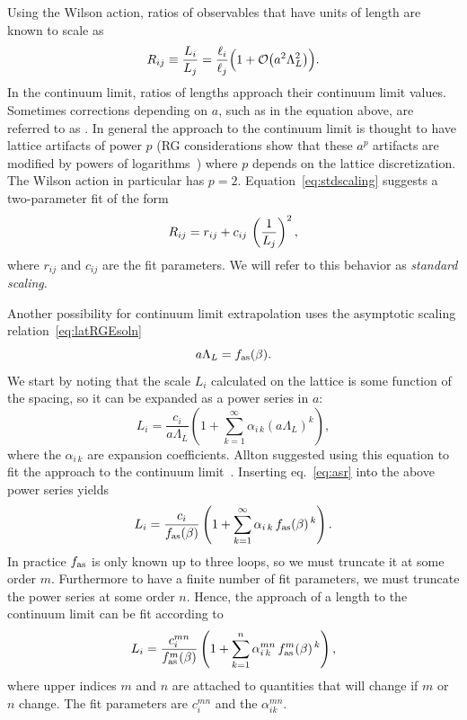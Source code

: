 Using the Wilson action, ratios of observables that have
units of length are known to scale as 
\begin{equation}\label{eq:stdscaling}
  R_{ij}\equiv\frac{L_i}{L_j}=\frac{\ell_i}{\ell_j}\Big(1+
                     \order{a^2\Lambda_L^2}\Big).
\end{equation}
In the continuum limit, ratios
of lengths approach their continuum limit values.
Sometimes corrections depending on $a$, such as in the equation above, are
referred to as . 
In general the approach to the
continuum limit is thought to have lattice artifacts of power $p$
(RG considerations show that these $a^p$ artifacts are modified by
powers of logarithms~\cite{montvay_quantum_1994}) where $p$ 
depends on the lattice discretization.
The Wilson action in particular has $p=2$.
Equation~\eqref{eq:stdscaling} suggests a two-parameter fit of the form
\begin{equation}\label{eq:stdscalingfit}\index{standard scaling}
  R_{ij}=r_{ij}+c_{ij}\,\left(\frac{1}{L_j}\right)^2,
\end{equation}
where $r_{ij}$ and $c_{ij}$ are the 
fit parameters. We will refer to this behavior as {\it standard scaling}. 

Another possibility for continuum limit extrapolation uses
the asymptotic scaling relation~\eqref{eq:latRGEsoln}
\begin{equation}\label{eq:asr}
  a\Lambda_L=f_{\text{as}}(\beta).
\end{equation}
We start by noting that the scale
$L_i$ calculated on the lattice is some function of the spacing,
so it can be expanded as a power series in $a$:
\begin{equation}
  L_i=\frac{c_i}{a\Lambda_L}\left(1+\sum\limits_{k=1}^{\infty}
                           \alpha_{i\,k}(a\Lambda_L)^k\right),
\end{equation}
where the $\alpha_{i\,k}$ are expansion coefficients.
Allton suggested using this equation to fit the approach to the continuum
limit~\cite{allton_lattice_1997}. Inserting eq.~\eqref{eq:asr}
into the above power series yields
\begin{equation}
  L_i=\frac{c_i}{f_{\text{as}}(\beta)}
              \left(1+\sum\limits_{k=1}^{\infty}
                    \alpha_{i\,k}\,f_{\text{as}}(\beta)^{\,k}\right).
\end{equation}
In practice $f_{\text{as}}$ is only known up to three loops, so we must
truncate it at some order $m$. Furthermore to have a finite number
of fit parameters, we must truncate the power series at some order
$n$. Hence, the approach of a length to the continuum limit can
be fit according to 
\begin{equation}\label{eq:lenasf}
  L_i=\frac{c^{mn}_i}{f_{\text{as}}^m(\beta)}
                    \left(1+\sum\limits_{k=1}^{n}
                    \alpha^{mn}_{i\,k}\,f_{\text{as}}^m(\beta)^{\,k}\right),
\end{equation}
where upper indices $m$ and $n$ are attached to quantities that
will change if $m$ or $n$ change. The fit parameters are
$c^{mn}_i$ and the $\alpha_{ik}^{mn}$. 

